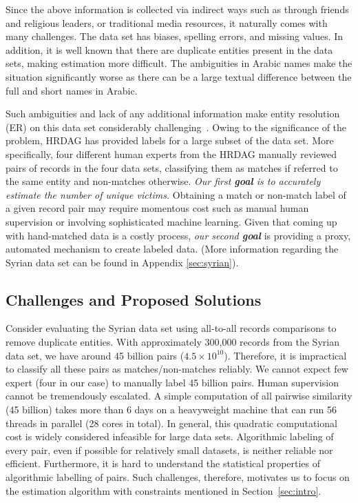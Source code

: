 \documentclass[aoas]{imsart}
\begin{document}
Since the above information is collected via indirect ways such as through friends and religious leaders, or traditional media resources, it naturally comes with many challenges. The data set has biases, spelling errors, and missing values. In addition, it is well known that there are duplicate entities present in the data sets, making estimation more difficult.
The ambiguities in Arabic names make the situation significantly worse as there can be a large textual difference between the full and short names in Arabic.

Such ambiguities and lack of any additional information make entity resolution (ER) on this data set considerably challenging~\citep{price2014updated}. Owing to the significance of the problem, HRDAG has provided labels for a large subset of the data set. More specifically, four different human experts from the HRDAG manually reviewed pairs of records in the four data sets, classifying them as matches if referred to the same entity and non-matches otherwise. {\em Our first {\bf goal} is to accurately estimate the number of unique victims.} Obtaining a match or non-match label of a given record pair may require momentous cost such as manual human supervision or involving sophisticated machine learning. Given that coming up with hand-matched data is a costly process,  {\em our second {\bf goal}} is providing a proxy, automated mechanism to create labeled data. (More information regarding the Syrian data set can be found in Appendix \ref{sec:syrian}).

\subsection{Challenges and Proposed Solutions}
\label{sec:SyriaChallenges}
Consider evaluating the Syrian data set using all-to-all records comparisons to remove duplicate entities. With approximately 300,000 records from the Syrian data set, we have around 45 billion pairs ($4.5 \times 10^{10}$). Therefore, it is impractical to classify all these pairs as matches/non-matches reliably. We cannot expect few expert (four in our case) to manually label 45 billion pairs. Human supervision cannot be tremendously escalated. A simple computation of all pairwise similarity (45 billion) takes more than 6 days on a heavyweight machine that can run 56 threads in parallel (28 cores in total). In general, this quadratic computational cost is widely considered infeasible for large data sets. Algorithmic labeling of every pair, even if possible for relatively small datasets, is neither reliable nor efficient. Furthermore, it is hard to understand the statistical properties of algorithmic labelling of pairs. Such challenges, therefore, motivates us to focus on the estimation algorithm with constraints mentioned in Section~\ref{sec:intro}.
\end{document}
